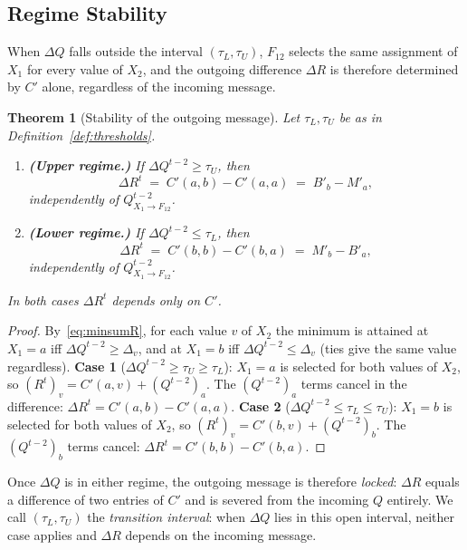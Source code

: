 \documentclass[letterpaper]{article} %
\newtheorem{theorem}{Theorem}[section]
\theoremstyle{definition}
\theoremstyle{remark}
\begin{document}
\subsection{Regime Stability}\label{sec:regimes}
When $\Delta Q$ falls outside the interval $(\tau_L, \tau_U)$, $F_{12}$ selects the same assignment of $X_1$ for every value of $X_2$, and the outgoing difference $\Delta R$ is therefore determined by $C'$ alone, regardless of the incoming message.
\begin{theorem}[Stability of the outgoing message]\label{thm:stability}
Let $\tau_L, \tau_U$ be as in Definition~\ref{def:thresholds}.
\begin{enumerate}
    \item \textbf{(Upper regime.)} If $\Delta Q^{t-2} \geq \tau_U$, then
    \[
        \Delta R^t \;=\; C'(a,b) - C'(a,a) \;=\; B'_b - M'_a,
    \]
    independently of $Q^{t-2}_{X_1 \to F_{12}}$.
    \item \textbf{(Lower regime.)} If $\Delta Q^{t-2} \leq \tau_L$, then
    \[
        \Delta R^t \;=\; C'(b,b) - C'(b,a) \;=\; M'_b - B'_a,
    \]
    independently of $Q^{t-2}_{X_1 \to F_{12}}$.
\end{enumerate}
In both cases $\Delta R^t$ depends only on $C'$.
\end{theorem}
\begin{proof}
By~\eqref{eq:minsumR}, for each value $v$ of $X_2$ the minimum is attained at $X_1=a$ iff $\Delta Q^{t-2} \geq \Delta_v$, and at $X_1=b$ iff $\Delta Q^{t-2} \leq \Delta_v$ (ties give the same value regardless).
\smallskip\noindent\textbf{Case 1} ($\Delta Q^{t-2} \geq \tau_U \geq \tau_L$):  $X_1=a$ is selected for both values of $X_2$, so $(R^t)_v = C'(a,v) + (Q^{t-2})_a$.  The $(Q^{t-2})_a$ terms cancel in the difference: $\Delta R^t = C'(a,b)-C'(a,a)$.
\smallskip\noindent\textbf{Case 2} ($\Delta Q^{t-2} \leq \tau_L \leq \tau_U$):  $X_1=b$ is selected for both values of $X_2$, so $(R^t)_v = C'(b,v) + (Q^{t-2})_b$.  The $(Q^{t-2})_b$ terms cancel: $\Delta R^t = C'(b,b)-C'(b,a)$. \qedhere
\end{proof}
Once $\Delta Q$ is in either regime, the outgoing message is therefore \emph{locked}: $\Delta R$ equals a difference of two entries of $C'$ and is severed from the incoming $Q$ entirely.  We call $(\tau_L, \tau_U)$ the \emph{transition interval}: when $\Delta Q$ lies in this open interval, neither case applies and $\Delta R$ depends on the incoming message.
\end{document}
